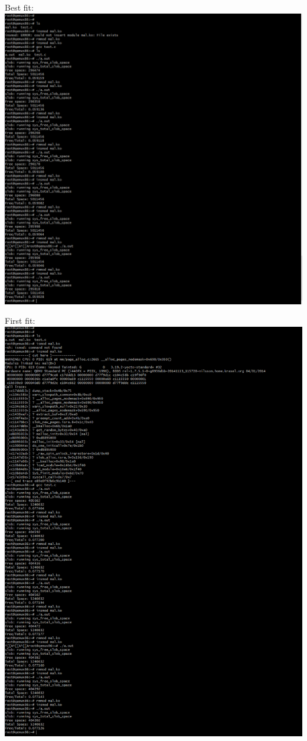 \documentclass[draftclsnofoot, onecolumn, compsoc, 10pt]{IEEEtran}
\begin{document}
Best fit:\\
\includegraphics[width=\linewidth]{Best_fit.PNG}

First fit:\\
\includegraphics[width=\linewidth]{First_fit.PNG}
\end{document}
